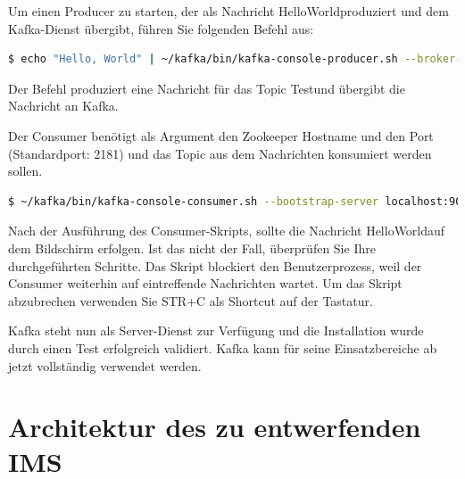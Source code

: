 \documentclass[a4paper,titlepage,halfparskip,12pt]{scrreprt}
\begin{document}
\pagebreak

Um einen Producer zu starten, der als Nachricht \glqq HelloWorld\grqq produziert und dem Kafka-Dienst übergibt, führen Sie folgenden Befehl aus:

\smallskip

\begin{lstlisting}[language=Bash]
$ echo "Hello, World" | ~/kafka/bin/kafka-console-producer.sh --broker-list localhost:9092 --topic Test > /dev/null
\end{lstlisting}

Der Befehl produziert eine Nachricht für das Topic \glqq Test\grqq und übergibt die Nachricht an Kafka.

Der Consumer benötigt als Argument den Zookeeper Hostname und den Port (Standardport: 2181) und das Topic aus dem Nachrichten konsumiert werden sollen.

\smallskip

\begin{lstlisting}[language=Bash]
$ ~/kafka/bin/kafka-console-consumer.sh --bootstrap-server localhost:9092 --topic Test --from-beginning
\end{lstlisting}

Nach der Ausführung des Consumer-Skripts, sollte die Nachricht \glqq HelloWorld\grqq auf dem Bildschirm erfolgen. Ist das nicht der Fall, überprüfen Sie Ihre durchgeführten Schritte. Das Skript blockiert den Benutzerprozess, weil der Consumer weiterhin auf eintreffende Nachrichten wartet. Um das Skript abzubrechen verwenden Sie STR+C als Shortcut auf der Tastatur.

Kafka steht nun als Server-Dienst zur Verfügung und die Installation wurde durch einen Test erfolgreich validiert. Kafka kann für seine Einsatzbereiche ab jetzt vollständig verwendet werden.

\chapter{Architektur des zu entwerfenden \ac{IMS}}
\end{document}
